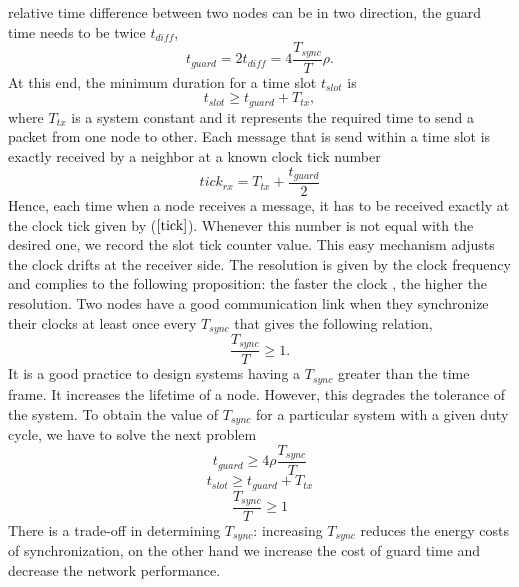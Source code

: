 \documentclass[a4paper,10pt]{report}
\begin{document}
relative time difference between two nodes can be in two direction,
the guard time needs to be twice $t_{diff}$,
\begin{equation}
t_{guard}= 2t_{diff} = 4\frac{T_{sync}}{T}\rho.
\end{equation}
At this end, the minimum duration for a time slot $t_{slot}$ is
\begin{equation}
t_{slot} \geq t_{guard} + T_{tx},
\end{equation}
where $T_{tx}$ is a system constant and it represents the required
time to send a packet from one node to other. \newline Each message
that is send within a time slot is exactly received by a neighbor at
a known clock tick number
\begin{equation}
tick_{rx} = T_{tx}+ \frac{t_{guard}}{2} \label{tick}
\end{equation}
Hence, each time when a node receives a message, it has to be
received exactly at the clock tick given by ($\ref{tick}$). Whenever
this number is not equal with the desired one, we record the slot
tick counter value. This easy mechanism adjusts the clock drifts at
the receiver side. The resolution is given by the clock frequency
and complies to the following proposition: the faster the clock ,
the higher the resolution.
\newline Two nodes have a good communication link when they synchronize
their clocks at least once every $T_{sync}$ that gives the following
relation,
\begin{equation}
\frac{T_{sync}}{T}\geq 1.
\end{equation}
It is a good practice to design systems having a $T_{sync}$ greater
than the time frame. It increases the lifetime of a node. However,
this degrades the tolerance of the system. To obtain the value of
$T_{sync}$ for a particular system with a given duty cycle, we have
to solve the next problem
\begin{equation}
t_{guard} \geq 4\rho \frac{T_{sync}}{T}
\end{equation}
\begin{equation}
t_{slot} \geq t_{guard} + T_{tx}
\end{equation}
\begin{equation}
\frac{T_{sync}}{T} \geq 1
\end{equation}
There is a trade-off in determining $T_{sync}$: increasing
$T_{sync}$ reduces the energy costs of synchronization, on the other
hand we increase the cost of guard time and decrease the network
performance.
\end{document}
